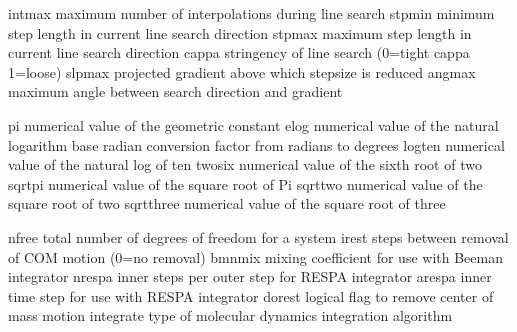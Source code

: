 \documentclass[letterpaper,11pt,english]{sphinxmanual}
\begin{document}
\sphinxAtStartPar
{}

\begin{sphinxVerbatim}[commandchars=\\\{\}]
intmax          maximum number of interpolations during line search
stpmin          minimum step length in current line search direction
stpmax          maximum step length in current line search direction
cappa           stringency of line search (0=tight \PYGZlt{} cappa \PYGZlt{} 1=loose)
slpmax          projected gradient above which stepsize is reduced
angmax          maximum angle between search direction and \PYGZhy{}gradient
\end{sphinxVerbatim}

\sphinxAtStartPar
{}

\begin{sphinxVerbatim}[commandchars=\\\{\}]
pi              numerical value of the geometric constant
elog            numerical value of the natural logarithm base
radian          conversion factor from radians to degrees
logten          numerical value of the natural log of ten
twosix          numerical value of the sixth root of two
sqrtpi          numerical value of the square root of Pi
sqrttwo         numerical value of the square root of two
sqrtthree       numerical value of the square root of three
\end{sphinxVerbatim}

\sphinxAtStartPar
{}

\begin{sphinxVerbatim}[commandchars=\\\{\}]
nfree           total number of degrees of freedom for a system
irest           steps between removal of COM motion (0=no removal)
bmnmix          mixing coefficient for use with Beeman integrator
nrespa          inner steps per outer step for RESPA integrator
arespa          inner time step for use with RESPA integrator
dorest          logical flag to remove center of mass motion
integrate       type of molecular dynamics integration algorithm
\end{sphinxVerbatim}

\sphinxAtStartPar
{}
\end{document}
